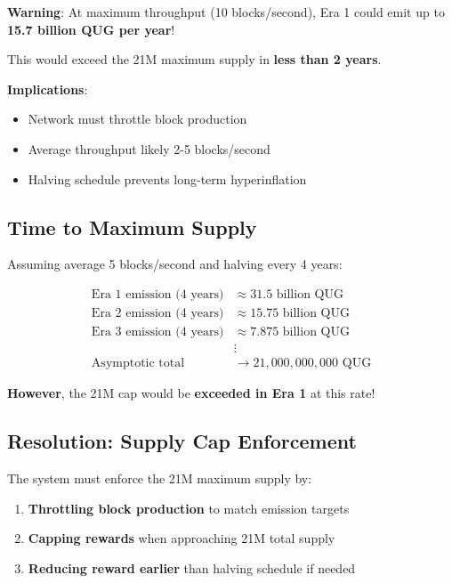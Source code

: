 \documentclass[11pt,a4paper]{article}
\begin{document}
\begin{tcolorbox}[colback=secondarycolor!10, colframe=secondarycolor, title={Important: High Initial Emission}]
\textbf{Warning}: At maximum throughput (10 blocks/second), Era 1 could emit up to \textbf{15.7 billion QUG per year}!

This would exceed the 21M maximum supply in \textbf{less than 2 years}.

\textbf{Implications}:
\begin{itemize}
    \item Network must throttle block production
    \item Average throughput likely 2-5 blocks/second
    \item Halving schedule prevents long-term hyperinflation
\end{itemize}
\end{tcolorbox}

\subsection{Time to Maximum Supply}

Assuming average 5 blocks/second and halving every 4 years:

\begin{align*}
\text{Era 1 emission (4 years)} &\approx 31.5 \text{ billion QUG} \\
\text{Era 2 emission (4 years)} &\approx 15.75 \text{ billion QUG} \\
\text{Era 3 emission (4 years)} &\approx 7.875 \text{ billion QUG} \\
&\vdots \\
\text{Asymptotic total} &\rightarrow 21,000,000,000 \text{ QUG}
\end{align*}

\textbf{However}, the 21M cap would be \textbf{exceeded in Era 1} at this rate!

\subsection{Resolution: Supply Cap Enforcement}

The system must enforce the 21M maximum supply by:
\begin{enumerate}
    \item \textbf{Throttling block production} to match emission targets
    \item \textbf{Capping rewards} when approaching 21M total supply
    \item \textbf{Reducing reward earlier} than halving schedule if needed
\end{enumerate}
\end{document}
